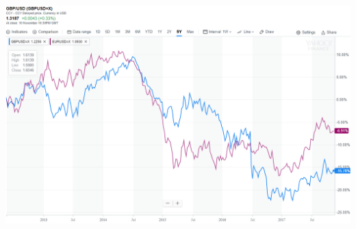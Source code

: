 \documentclass{beamer}
\begin{document}
\begin{frame}
\hspace*{-4mm}
\includegraphics[width=0.9\paperwidth]{img/motivation.png}
\end{frame}
\end{document}
